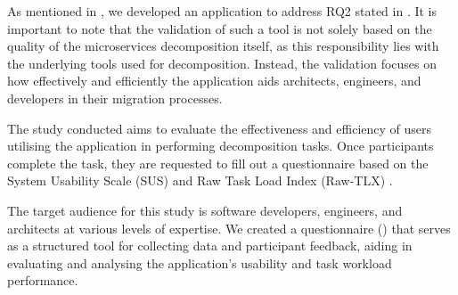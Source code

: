 As mentioned in , we developed an application to address
RQ2 stated in . It is important to note that the
validation of such a tool is not solely based on the quality of the
microservices decomposition itself, as this responsibility lies with the
underlying tools used for decomposition. Instead, the validation focuses on how
effectively and efficiently the application aids architects, engineers, and
developers in their migration processes.

The study conducted aims to evaluate the effectiveness and efficiency of users
utilising the application in performing decomposition tasks. Once participants
complete the task, they are requested to fill out a questionnaire based on the
System Usability Scale (SUS) \cite{brooke1996sus} and Raw Task Load Index
(Raw-TLX) \cite{hart2006nasa}.

The target audience for this study is software developers, engineers, and
architects at various levels of expertise. We created a questionnaire
() that serves as a structured tool for collecting data and
participant feedback, aiding in evaluating and analysing the application's
usability and task workload performance.
